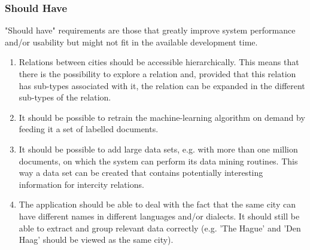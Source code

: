 \subsubsection {Should Have}
"Should have" requirements are those that greatly improve system performance and/or usability but might not fit in the available development time.

\begin{enumerate}
    \item Relations between cities should be accessible hierarchically. This means that there is the possibility to explore a relation and, provided that this relation has sub-types associated with it, the relation can be expanded in the different sub-types of the relation.
    \item It should be possible to retrain the machine-learning algorithm on demand by feeding it a set of labelled documents.
    \item It should be possible to add large data sets, e.g. with more than one million documents, on which the system can perform its data mining routines. This way a data set can be created that contains potentially interesting information for intercity relations.
    \item The application should be able to deal with the fact that the same city can have different names in different languages and/or dialects. It should still be able to extract and group relevant data correctly (e.g. 'The Hague' and 'Den Haag' should be viewed as the same city).
\end{enumerate}
\iffalse
